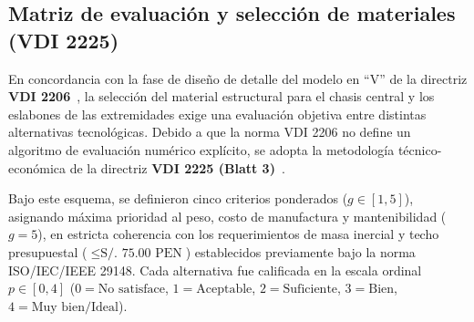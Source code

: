 \subsection{Matriz de evaluación y selección de materiales (VDI 2225)}

En concordancia con la fase de diseño de detalle del modelo en ``V'' de la directriz \textbf{VDI 2206}~\cite{VDI2206_2004}, la selección del material estructural para el chasis central y los eslabones de las extremidades exige una evaluación objetiva entre distintas alternativas tecnológicas. Debido a que la norma VDI 2206 no define un algoritmo de evaluación numérico explícito, se adopta la metodología técnico-económica de la directriz \textbf{VDI 2225 (Blatt 3)}~\cite{Reumann2012}.


Bajo este esquema, se definieron cinco criterios ponderados ($g \in [1,5]$), asignando máxima prioridad al peso, costo de manufactura y mantenibilidad ($g=5$), en estricta coherencia con los requerimientos de masa inercial y techo presupuestal ($\le \text{S/. 75.00 PEN}$) establecidos previamente bajo la norma ISO/IEC/IEEE 29148. Cada alternativa fue calificada en la escala ordinal $p \in [0,4]$ ($0 = \text{No satisface}$, $1 = \text{Aceptable}$, $2 = \text{Suficiente}$, $3 = \text{Bien}$, $4 = \text{Muy bien/Ideal}$).

